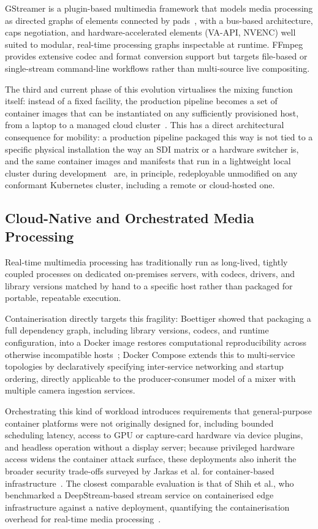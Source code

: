 \documentclass[electronics,article,submit,pdftex,moreauthors]{Definitions/mdpi}
\begin{document}
GStreamer is a plugin-based multimedia framework that models media processing as directed graphs of elements connected by
pads~\cite{gstreamer_docs}, with a bus-based architecture, caps negotiation, and hardware-accelerated elements (VA-API, NVENC) well suited to modular, real-time processing graphs inspectable at runtime. FFmpeg provides extensive codec and format conversion support but targets file-based or single-stream command-line workflows rather than multi-source live compositing.

The third and current phase of this evolution virtualises the mixing function itself: instead of a fixed facility, the production pipeline becomes a set of container images that can be instantiated on any sufficiently provisioned host, from a laptop to a managed cloud cluster~\cite{kubernetes_burns2016}. This has a direct architectural consequence for mobility: a production pipeline packaged this way is not tied to a specific physical installation the way an SDI matrix or a hardware switcher is, and the same container images and manifests that run in a lightweight local cluster during development~\cite{minikube_docs} are, in principle, redeployable unmodified on any conformant Kubernetes cluster, including a remote or cloud-hosted one. 


\subsection{Cloud-Native and Orchestrated Media Processing}

Real-time multimedia processing has traditionally run as long-lived, tightly coupled processes on dedicated on-premises servers, with codecs, drivers, and library versions matched by hand to a specific host rather than packaged for portable, repeatable execution.

Containerisation directly targets this fragility: Boettiger showed that packaging a full dependency graph, including library versions, codecs, and runtime configuration, into a Docker image restores computational reproducibility across otherwise incompatible hosts~\cite{boettiger2015_docker_reproducibility}; Docker Compose extends this to multi-service topologies by declaratively specifying inter-service networking and startup ordering, directly applicable to the producer-consumer model of a mixer with multiple camera ingestion services.

Orchestrating this kind of workload introduces requirements that general-purpose container platforms were not originally designed for, including bounded scheduling latency, access to GPU or capture-card hardware via device plugins, and headless operation without a display server; because privileged hardware access widens the container attack surface, these deployments also inherit the broader security trade-offs surveyed by Jarkas et al. for container-based infrastructure~\cite{jarkas2025_container_security}. The closest comparable evaluation is that of Shih et al., who benchmarked a DeepStream-based stream service on containerised edge infrastructure against a native deployment, quantifying the containerisation overhead for real-time media processing~\cite{shih2025_containerized_gstreamer}.
\end{document}
